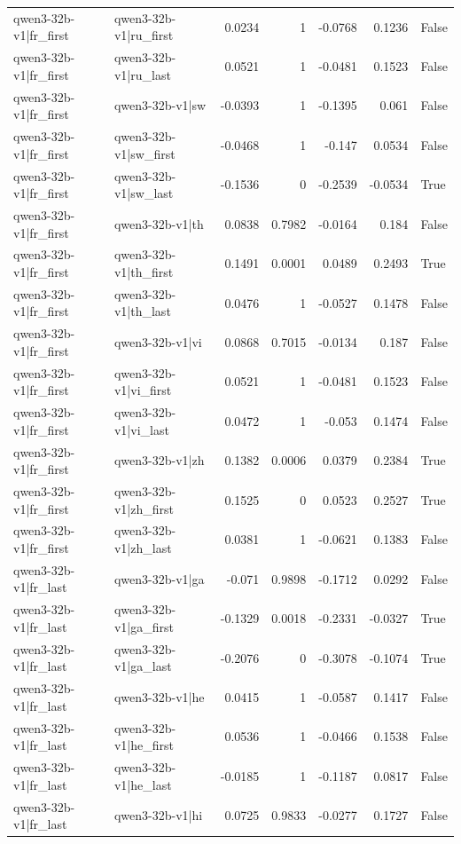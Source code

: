 \begin{table}
\begin{tabular}{l l r r r r l}
qwen3-32b-v1|fr_first & qwen3-32b-v1|ru_first & 0.0234 & 1 & -0.0768 & 0.1236 & False \\
qwen3-32b-v1|fr_first & qwen3-32b-v1|ru_last & 0.0521 & 1 & -0.0481 & 0.1523 & False \\
qwen3-32b-v1|fr_first & qwen3-32b-v1|sw & -0.0393 & 1 & -0.1395 & 0.061 & False \\
qwen3-32b-v1|fr_first & qwen3-32b-v1|sw_first & -0.0468 & 1 & -0.147 & 0.0534 & False \\
qwen3-32b-v1|fr_first & qwen3-32b-v1|sw_last & -0.1536 & 0 & -0.2539 & -0.0534 & True \\
qwen3-32b-v1|fr_first & qwen3-32b-v1|th & 0.0838 & 0.7982 & -0.0164 & 0.184 & False \\
qwen3-32b-v1|fr_first & qwen3-32b-v1|th_first & 0.1491 & 0.0001 & 0.0489 & 0.2493 & True \\
qwen3-32b-v1|fr_first & qwen3-32b-v1|th_last & 0.0476 & 1 & -0.0527 & 0.1478 & False \\
qwen3-32b-v1|fr_first & qwen3-32b-v1|vi & 0.0868 & 0.7015 & -0.0134 & 0.187 & False \\
qwen3-32b-v1|fr_first & qwen3-32b-v1|vi_first & 0.0521 & 1 & -0.0481 & 0.1523 & False \\
qwen3-32b-v1|fr_first & qwen3-32b-v1|vi_last & 0.0472 & 1 & -0.053 & 0.1474 & False \\
qwen3-32b-v1|fr_first & qwen3-32b-v1|zh & 0.1382 & 0.0006 & 0.0379 & 0.2384 & True \\
qwen3-32b-v1|fr_first & qwen3-32b-v1|zh_first & 0.1525 & 0 & 0.0523 & 0.2527 & True \\
qwen3-32b-v1|fr_first & qwen3-32b-v1|zh_last & 0.0381 & 1 & -0.0621 & 0.1383 & False \\
qwen3-32b-v1|fr_last & qwen3-32b-v1|ga & -0.071 & 0.9898 & -0.1712 & 0.0292 & False \\
qwen3-32b-v1|fr_last & qwen3-32b-v1|ga_first & -0.1329 & 0.0018 & -0.2331 & -0.0327 & True \\
qwen3-32b-v1|fr_last & qwen3-32b-v1|ga_last & -0.2076 & 0 & -0.3078 & -0.1074 & True \\
qwen3-32b-v1|fr_last & qwen3-32b-v1|he & 0.0415 & 1 & -0.0587 & 0.1417 & False \\
qwen3-32b-v1|fr_last & qwen3-32b-v1|he_first & 0.0536 & 1 & -0.0466 & 0.1538 & False \\
qwen3-32b-v1|fr_last & qwen3-32b-v1|he_last & -0.0185 & 1 & -0.1187 & 0.0817 & False \\
qwen3-32b-v1|fr_last & qwen3-32b-v1|hi & 0.0725 & 0.9833 & -0.0277 & 0.1727 & False \\

\end{tabular}
\end{table}
